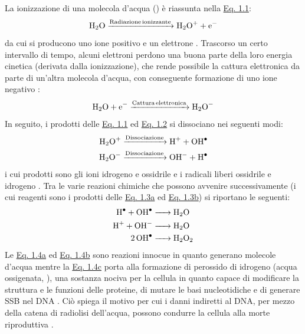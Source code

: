 \documentclass[12pt,a4paper,twoside]{report}
\begin{document}
	La ionizzazione di una molecola d'acqua () è riassunta nella \hyperref[eq:radiolisi1]{Eq. 1.1}:
	\begin{equation}
		\ce{H2O ->[Radiazione ionizzante] H2O^{+} + e^-}
		\label{eq:radiolisi1}
	\end{equation}
	da cui si producono uno ione positivo  e un elettrone . Trascorso un certo intervallo di tempo, alcuni elettroni perdono una buona parte della loro energia cinetica (derivata dalla ionizzazione), che rende possibile la cattura elettronica da parte di un'altra molecola d'acqua, con conseguente formazione di uno ione negativo :
	\begin{equation}
		\ce{H2O + e^{-} ->[Cattura elettronica] H2O^{-}}
		\label{eq:radiolisi2}
	\end{equation}
	In seguito, i prodotti delle \hyperref[eq:radiolisi1]{Eq. 1.1} ed \hyperref[eq:radiolisi2]{Eq. 1.2} si dissociano nei seguenti modi:
	\begin{subequations}
		\begin{align}
			\label{eq:dissociazione1}
			\ce{H2O^{+} ->[Dissociazione] H^{+} + OH^{.}}\\
			\label{eq:dissociazione2}
			\ce{H2O^{-} ->[Dissociazione] OH^{-} + H^{.}}
		\end{align}
	\end{subequations}
	i cui prodotti sono gli ioni idrogeno  e ossidrile  e i radicali liberi ossidrile  e idrogeno . Tra le varie reazioni chimiche che possono avvenire successivamente (i cui reagenti sono i prodotti delle \hyperref[eq:dissociazione1]{Eq. 1.3a} ed \hyperref[eq:dissociazione2]{Eq. 1.3b}) si riportano le seguenti:
	\begin{subequations}
		\begin{align}
			\label{eq:prodotto1}
			\ce{H^{.} + OH^{.} &-> H2O}\\
			\label{eq:prodotto2}
			\ce{H^{+} + OH^{-} &-> H2O}\\
			\label{eq:prodotto3}
			\ce{2OH^{.} &-> H2O2}
		\end{align}
	\end{subequations}
	Le \hyperref[eq:prodotto1]{Eq. 1.4a} ed \hyperref[eq:prodotto2]{Eq. 1.4b} sono reazioni innocue in quanto generano molecole d'acqua mentre la \hyperref[eq:prodotto3]{Eq. 1.4c} porta alla formazione di perossido di idrogeno (acqua ossigenata, ), una sostanza nociva per la cellula in quanto capace di modificare la struttura e le funzioni delle proteine, di mutare le basi nucleotidiche e di generare SSB nel DNA \cite{ros}. Ciò spiega il motivo per cui i danni indiretti al DNA, per mezzo della catena di radiolisi dell'acqua, possono condurre la cellula alla morte riproduttiva \cite{w3010235}.
	
\end{document}
